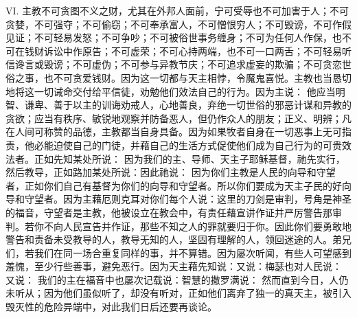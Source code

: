 VI. 主教不可贪图不义之财，尤其在外邦人面前，宁可受辱也不可加害于人；不可贪婪，不可强夺；不可偷窃；不可奉承富人，不可憎恨穷人；不可毁谤，不可作假见证；不可轻易发怒；不可争吵；不可被俗世事务缠身；不可为任何人作保，也不可在钱财诉讼中作原告；不可虚荣；不可心持两端，也不可一口两舌；不可轻易听信谗言或毁谤；不可虚伪；不可参与异教节庆；不可追求虚妄的欺骗；不可贪恋世俗之事，也不可贪爱钱财。因为这一切都与天主相悖，令魔鬼喜悦。主教也当恳切地将这一切诫命交付给平信徒，劝勉他们效法自己的行为。因为主说： 他应当明智、谦卑、善于以主的训诲劝戒人，心地善良，弃绝一切世俗的邪恶计谋和异教的贪欲；应当有秩序、敏锐地观察并防备恶人，但仍作众人的朋友；正义、明辨；凡在人间可称赞的品德，主教都当自身具备。因为如果牧者自身在一切恶事上无可指责，他必能迫使自己的门徒，并藉自己的生活方式促使他们成为自己行为的可贵效法者。正如先知某处所说： 因为我们的主、导师、天主子耶稣基督，祂先实行，然后教导，正如路加某处所说：因此祂说： 因为你们主教是人民的向导和守望者，正如你们自己有基督为你们的向导和守望者。所以你们要成为天主子民的好向导和守望者。因为主藉厄则克耳对你们每个人说：\newline{}这里的刀剑是审判，号角是神圣的福音，守望者是主教，他被设立在教会中，有责任藉宣讲作证并严厉警告那审判。若你不向人民宣告并作证，那些不知之人的罪就要归于你。因此你们要勇敢地警告和责备未受教导的人，教导无知的人，坚固有理解的人，领回迷途的人。弟兄们，若我们在同一场合重复同样的事，并不算错。因为屡次听闻，有些人可望感到羞愧，至少行些善事，避免恶行。因为天主藉先知说：又说：梅瑟也对人民说： 又说： 我们的主在福音中也屡次记载说：智慧的撒罗满说： 然而直到今日，人仍未听从；因为他们虽似听了，却没有听对，正如他们离弃了独一的真天主，被引入毁灭性的危险异端中，对此我们日后还要再谈论。\par

